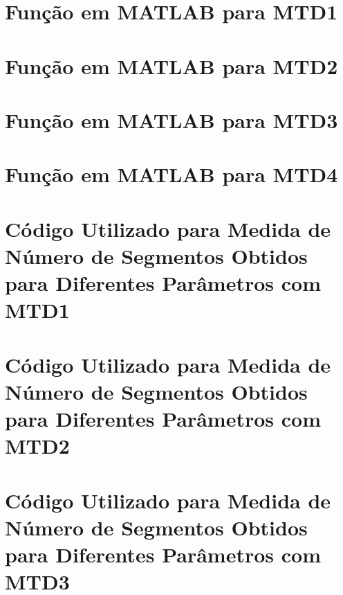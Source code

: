 	\begin{apendicesenv}
	\partapendices
\chapter{Função em MATLAB para MTD1}

\label{ap:seg_mtd1}
\chapter{Função em MATLAB para MTD2}

\label{ap:seg_mtd2}
\chapter{Função em MATLAB para MTD3}

\label{ap:seg_mtd3}
\chapter{Função em MATLAB para MTD4}
%
\label{ap:seg_mtd4}
\chapter{Código Utilizado para Medida de Número de Segmentos Obtidos para Diferentes Parâmetros com MTD1}

\label{ap:num_mtd1}
\chapter{Código Utilizado para Medida de Número de Segmentos Obtidos para Diferentes Parâmetros com MTD2}

\label{ap:num_mtd2}
\chapter{Código Utilizado para Medida de Número de Segmentos Obtidos para Diferentes Parâmetros com MTD3}

\label{ap:num_mtd3}

\end{apendicesenv}
